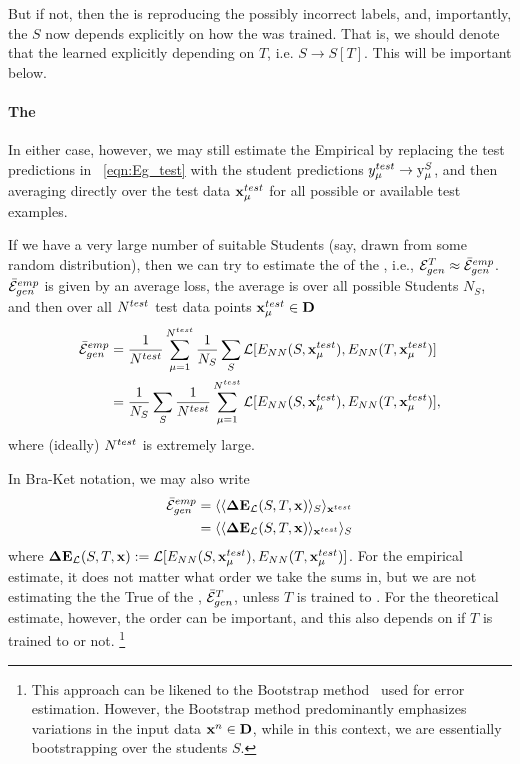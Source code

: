 But if not, then the \Student is reproducing the possibly
incorrect \Teacher labels, and, importantly, the \Student $S$ now depends explicitly
on how the \Teacher was trained.  That is, we should denote that the learned
\Student explicitly depending on $T$, i.e. $S\rightarrow S[T]$.
This will be important below.

\paragraph{The \AverageGeneralizationError}
In either case, however, we may still estimate the Empirical \AverageGeneralizationError
by replacing the test predictions in \EQN~\ref{eqn:Eg_test} with the student predictions
$y_{\mu}^{test}\rightarrow \mathrm{y}_{\mu}^{S}$, and then averaging directly over the test data $\mathbf{x}_{\mu}^{test}$
for all possible or available test examples.

If we have a very large number of suitable Students
(say, drawn from some random distribution), then we can try to estimate the 
\AverageGeneralizationError of the \Teacher, i.e., ${\mathcal{E}}_{gen}^{T}\approx\bar{\mathcal{E}}^{emp}_{gen}$.
$\bar{\mathcal{E}}^{emp}_{gen}$ is given by an average loss, the average is 
over all possible Students $N_S$,  and then  over all  $N^{test}$ test data points $\mathbf{x}_{\mu}^{test}\in\mathbf{D}$ 
\begin{align}
  \bar{\mathcal{E}}^{emp}_{gen}
  &=
  \frac{1}{N^{test}}\sum_{\mu=1}^{N^{test}}
  \frac{1}{N_S}\sum_{S}
  \mathcal{L}[E_{NN}(S,\mathbf{x}_{\mu}^{test}),E_{NN}(T,\mathbf{x}_{\mu}^{test})]  \\ \nonumber
    &=
  \frac{1}{N_S}\sum_{S}
    \frac{1}{N^{test}}\sum_{\mu=1}^{N^{test}}
    \mathcal{L}[E_{NN}(S,\mathbf{x}_{\mu}^{test}),E_{NN}(T,\mathbf{x}_{\mu}^{test})] ,
\label{eqn:emp_gen_error}
\end{align}
where (ideally) $N^{test}$ is extremely large.

In Bra-Ket notation, we may also write
\begin{align}
  \bar{\mathcal{E}}^{emp}_{gen}
  &= \langle \langle \mathbf{\Delta {E}}_{\mathcal{L}}(S,T,\mathbf{x}) \rangle_{S} \rangle_{\mathbf{x}^{test}}\\ \nonumber
  &= \langle \langle \mathbf{\Delta {E}}_{\mathcal{L}}(S,T,\mathbf{x}) \rangle_{\mathbf{x}^{test}} \rangle_{S}
\end{align}
where $\mathbf{\Delta {E}}_{\mathcal{L}}(S,T,\mathbf{x}):=\mathcal{L}[E_{NN}(S,\mathbf{x}_{\mu}^{test}),E_{NN}(T,\mathbf{x}_{\mu}^{test})]$.
For the empirical estimate, it does not matter what order we take the sums in,
but we are not estimating the
the True \AverageGeneralizationError  of the \Teacher, $\bar{\mathcal{E}}_{gen}^{T}$,
unless $T$ is trained to \Interpolation.
For the theoretical estimate, however, the order can be important, and this also depends on
if $T$ is trained to \Interpolation or not.
\footnote{This approach can be likened to the Bootstrap method~\cite{efron1993bootstrap} used for error estimation.  However, the Bootstrap method predominantly emphasizes variations in the input data $\mathbf{x}^{n}\in\mathbf{D}$, while in this context, we are essentially bootstrapping over the students $S$.}

